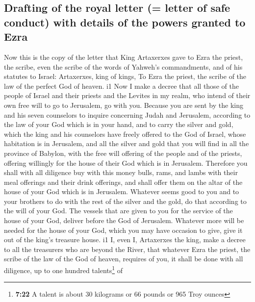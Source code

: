 \begin{paracol}{2}
\begin{otherlanguage}{english}
\hypertarget{drafting-of-the-royal-letter-letter-of-safe-conduct-with-details-of-the-powers-granted-to-ezra}{%
\subsection{Drafting of the royal letter (= letter of safe conduct) with
details of the powers granted to
Ezra}\label{drafting-of-the-royal-letter-letter-of-safe-conduct-with-details-of-the-powers-granted-to-ezra}}

 Now this is the copy of the letter that King Artaxerxes
gave to Ezra the priest, the scribe, even the scribe of the words of
Yahweh's commandments, and of his statutes to Israel: 
Artaxerxes, king of kings, To Ezra the priest, the scribe of the law of
the perfect God of heaven. i1 Now  I make a decree that
all those of the people of Israel and their priests and the Levites in
my realm, who intend of their own free will to go to Jerusalem, go with
you.  Because you are sent by the king and his seven
counselors to inquire concerning Judah and Jerusalem, according to the
law of your God which is in your hand,  and to carry the
silver and gold, which the king and his counselors have freely offered
to the God of Israel, whose habitation is in Jerusalem, 
and all the silver and gold that you will find in all the province of
Babylon, with the free will offering of the people and of the priests,
offering willingly for the house of their God which is in Jerusalem.
 Therefore you shall with all diligence buy with this
money bulls, rams, and lambs with their meal offerings and their drink
offerings, and shall offer them on the altar of the house of your God
which is in Jerusalem.  Whatever seems good to you and to
your brothers to do with the rest of the silver and the gold, do that
according to the will of your God.  The vessels that are
given to you for the service of the house of your God, deliver before
the God of Jerusalem.  Whatever more will be needed for
the house of your God, which you may have occasion to give, give it out
of the king's treasure house. i1  I, even I, Artaxerxes
the king, make a decree to all the treasurers who are beyond the River,
that whatever Ezra the priest, the scribe of the law of the God of
heaven, requires of you, it shall be done with all diligence,
 up to one hundred talents\footnote{\textbf{7:22} A
  talent is about 30 kilograms or 66 pounds or 965 Troy ounces} of

\end{otherlanguage}
\end{paracol}
